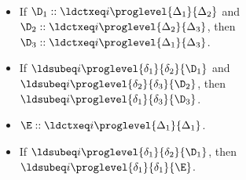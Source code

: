 \begin{lemma} $ $
  \begin{itemize}
  \item If $\D_1 :: \ldctxeq i \proglevel{\Delta_1}{\Delta_2}$ and
    $\D_2 :: \ldctxeq i \proglevel{\Delta_2}{\Delta_3}$, then
    $\D_3 :: \ldctxeq i \proglevel{\Delta_1}{\Delta_3}$.
  \item If $\ldsubeq i \proglevel{\delta_1}{\delta_2}{\D_1}$ and
    $\ldsubeq i \proglevel{\delta_2}{\delta_3}{\D_2}$, then
    $\ldsubeq i \proglevel{\delta_1}{\delta_3}{\D_3}$.
  \item $\E :: \ldctxeq i \proglevel{\Delta_1}{\Delta_1}$.
  \item If $\ldsubeq i \proglevel{\delta_1}{\delta_2}{\D_1}$, then $\ldsubeq i \proglevel{\delta_1}{\delta_1}{\E}$.
  \end{itemize}  
\end{lemma}
